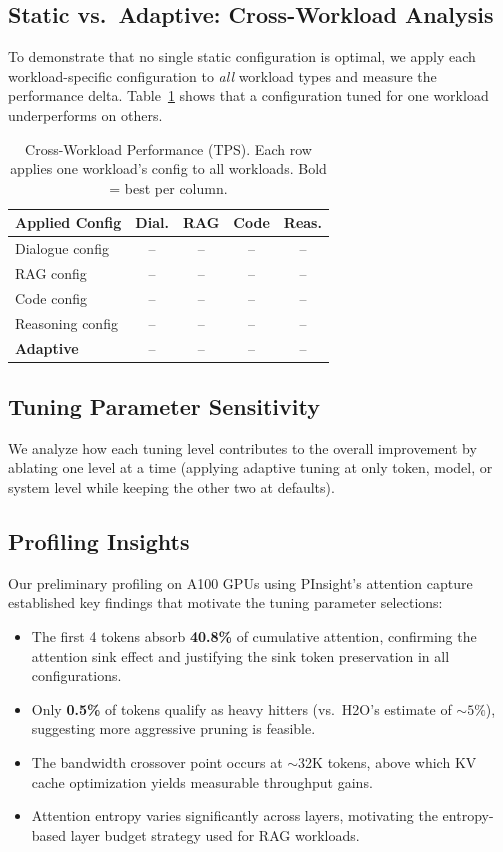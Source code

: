 \documentclass[conference]{IEEEtran}
\begin{document}
\subsection{Static vs.\ Adaptive: Cross-Workload Analysis}

To demonstrate that no single static configuration is optimal, we apply each workload-specific configuration to \textit{all} workload types and measure the performance delta. Table~\ref{tab:cross} shows that a configuration tuned for one workload underperforms on others.

\begin{table}[h]
\centering
\caption{Cross-Workload Performance (TPS). Each row applies one workload's config to all workloads. Bold = best per column.}
\label{tab:cross}
\begin{tabular}{@{}lcccc@{}}
\toprule
\textbf{Applied Config} & \textbf{Dial.} & \textbf{RAG} & \textbf{Code} & \textbf{Reas.} \\
\midrule
Dialogue config & -- & -- & -- & -- \\
RAG config & -- & -- & -- & -- \\
Code config & -- & -- & -- & -- \\
Reasoning config & -- & -- & -- & -- \\
\textbf{Adaptive} & -- & -- & -- & -- \\
\bottomrule
\end{tabular}
\end{table}

\subsection{Tuning Parameter Sensitivity}

We analyze how each tuning level contributes to the overall improvement by ablating one level at a time (applying adaptive tuning at only token, model, or system level while keeping the other two at defaults).

\subsection{Profiling Insights}

Our preliminary profiling on A100 GPUs using PInsight's attention capture established key findings that motivate the tuning parameter selections:
\begin{itemize}
\item The first 4 tokens absorb \textbf{40.8\%} of cumulative attention, confirming the attention sink effect and justifying the sink token preservation in all configurations.
\item Only \textbf{0.5\%} of tokens qualify as heavy hitters (vs.\ H2O's estimate of ${\sim}5\%$), suggesting more aggressive pruning is feasible.
\item The bandwidth crossover point occurs at ${\sim}$32K tokens, above which KV cache optimization yields measurable throughput gains.
\item Attention entropy varies significantly across layers, motivating the entropy-based layer budget strategy used for RAG workloads.
\end{itemize}
\end{document}
